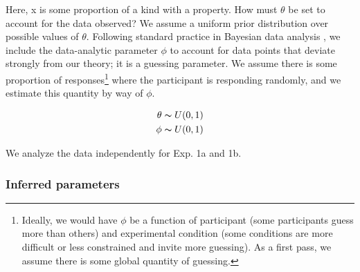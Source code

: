 \documentclass[10pt,letterpaper]{article}
\newcommand{\red}[1]{\textcolor{Red}{#1}}
\begin{document}
Here, x is some proportion of a kind with a property. How must $\theta$ be set to account for the data observed? We assume a uniform prior distribution over possible values of $\theta$. Following standard practice in Bayesian data analysis \cite{LW2014}, we include the data-analytic parameter $\phi$ to account for data points that deviate strongly from our theory; it is a guessing parameter. We assume there is some proportion of responses\footnote{Ideally, we would have $\phi$ be a function of participant (some participants guess more than others) and experimental condition (some conditions are more difficult or less constrained and invite more guessing). As a first pass, we assume there is some global quantity of guessing.} where the participant is responding randomly, and we estimate this quantity by way of $\phi$.

\begin{align*}
\theta \thicksim U(0,1) \\
\phi \thicksim U(0,1) %
\end{align*}

%

%
%	
%		
%			

We analyze the data independently for Exp. 1a and 1b.

\subsubsection{Inferred parameters}
\end{document}
